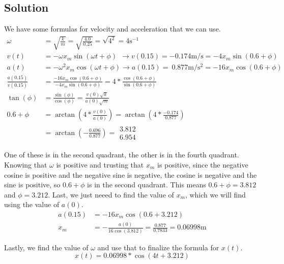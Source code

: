 \documentclass[12pt]{article}
\begin{document}
\subsection{Solution}
We have some formulas for velocity and acceleration that we can use.
\begin{align}
    \omega  &=  \sqrt{\frac{k}{m}}
        =   \sqrt{\frac{4.0}{0.25}} =   \sqrt{4^2}
        =   4\unit{\second^{-1}}\\
    v(t)    &=  -\omega x_m \sin(\omega t + \phi)\ \ \rightarrow
    v(0.15) =   -0.174 \unit{\meter/\second}
        =   -4 x_m \sin(0.6 + \phi)\\
    a(t)    &=  -\omega^2 x_m \cos(\omega t + \phi)\rightarrow
    a(0.15) =   \ 0.877 \unit{\meter/\second^2}
        =   -16 x_m \cos(0.6 + \phi)\\
    \frac{a(0.15)}{v(0.15)} &=  \frac{-16 x_m \cos(0.6 + \phi)}{-4 x_m \sin(0.6 + \phi)}
        =   4*\frac{\cos(0.6 + \phi)}{\sin(0.6 + \phi)}\\
    \tan(\phi)  &=  \frac{\sin(\phi)}{\cos(\phi)}
        =   \frac{v(0)\sqrt{k}}{a(0)\sqrt{m}}\\
    0.6 + \phi  &=  \arctan\left(4*\frac{v(0)}{a(0)}\right)
        =   \arctan\left(4*\frac{-0.174}{0.877}\right)\\
        &=  \arctan\left(-\frac{0.696}{0.877}\right)
        =   \begin{matrix} 3.812 \\ 6.954 \end{matrix}
\end{align}

One of these is in the second quadrant, the other is in the fourth quadrant. Knowing that $\omega$ is positive and trusting that $x_m$ is positive, since the negative cosine is positive and the negative sine is negative, the cosine is negative and the sine is positive, so $0.6 + \phi$ is in the second quadrant. This means $0.6 + \phi = 3.812$ and $\phi = 3.212$. Last, we just neeed to find the value of $x_m$, which we will find using the value of $a(0)$.
\begin{align}
    a(0.15)    &=  -16 x_m \cos(0.6 + 3.212)\\
    x_m &=  -\frac{a(0)}{16\cos(3.812)}
        =   \frac{0.877}{0.7833}
        =   0.06998\unit{\meter}
\end{align}

Lastly, we find the value of $\omega$ and use that to finalize the formula for $x(t)$. 
\begin{equation}
    \boxed{x(t) =  0.06998*\cos(4t + 3.212)}
\end{equation}
\end{document}
